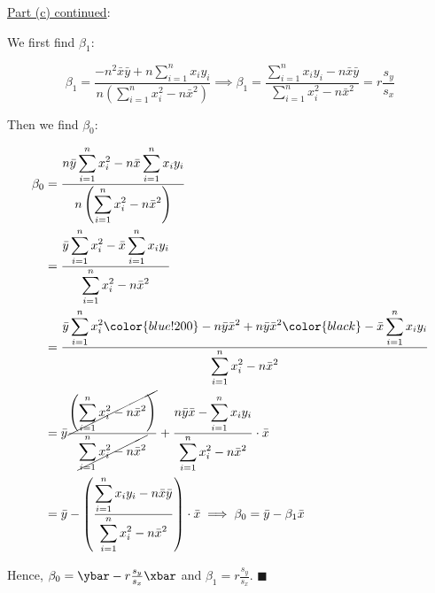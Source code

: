 \documentclass[12pt]{article}
\newcommand{\snmath}{\displaystyle\sum_{i=1}^n}
\begin{document}
\begin{enumerate}
\begin{tcolorbox}[colback=white, sharp corners]
\end{tcolorbox}

\newpage

\begin{tcolorbox}[colback = white, sharp corners]

\underline{Part (c) continued}: 

\vspace{3mm}

We first find $\beta_1:$

\[
	\beta_1 = \dfrac{- n^2 \bar{x} \bar{y} + n \snmath x_i y_i  }{n \left(  \snmath x_i^2 -  n \bar{x}^2 \right)} \implies \beta_1 = \dfrac{ \snmath x_i y_i - n \bar{x} \bar{y} }{ \snmath x_i^2 -  n \bar{x}^2 } = r \frac{s_y}{s_x}
\]

\vspace{3mm}

Then we find $\beta_0:$

\begin{align*}
	\beta_0 &= \dfrac{ n \bar{y} \snmath x_i^2  - n \bar{x} \snmath x_i y_i  }{n \left(  \snmath x_i^2 -  n \bar{x}^2 \right)} \\
	&= \dfrac{ \bar{y} \snmath x_i^2  - \bar{x} \snmath x_i y_i  }{   \snmath x_i^2 -  n \bar{x}^2 }\\
	&= \dfrac{ \bar{y} \snmath x_i^2  \color{blue!200} - n\bar{y}\bar{x}^2 + n\bar{y}\bar{x}^2  \color{black}  - \bar{x} \snmath x_i y_i  }{   \snmath x_i^2 -  n \bar{x}^2 }\\
	&= \bar{y} \dfrac{  \cancel{\left(  \snmath x_i^2   - n\bar{x}^2   \right)}}{ \cancel{ \snmath x_i^2 -  n \bar{x}^2 } } + \dfrac{   n\bar{y}\bar{x}   -  \snmath x_i y_i  }{   \snmath x_i^2 -  n \bar{x}^2 } \cdot \bar{x} \\
	&= \bar{y} - \left( \dfrac{\snmath x_i y_i - n\bar{x}\bar{y}}{ \snmath x_i^2 -  n \bar{x}^2} \right) \cdot \bar{x} \implies \beta_0 = \bar{y} - \beta_1 \bar{x}
\end{align*}

Hence, $\beta_0 = \ybar - r \frac{s_y}{s_x} \xbar$ and $\beta_1 = r \frac{s_y}{s_x}$. \quad $\blacksquare$

\end{tcolorbox}

\newpage

 

\begin{tcolorbox}[colback=white, sharp corners]


\end{tcolorbox}
\end{enumerate}
\end{document}
